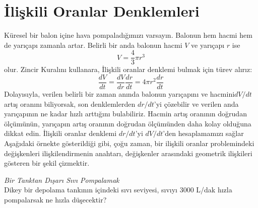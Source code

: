 \section{\protect İlişkili Oranlar Denklemleri}
Küresel bir balon içine hava pompaladığımızı varsayın. Balonun hem hacmi hem de yarıçapı zamanla artar. Belirli bir anda balonun hacmi $V$ ve yarıçapı $r$ ise
	\begin{equation*}
	V=\frac{4}{3}\pi r^3
	\end{equation*}
olur. Zincir Kuralını kullanara, İlişkili oranlar denklemi bulmak için türev alırız:
	\begin{equation*}
	\frac{dV}{dt}=\frac{dV}{dr}\frac{dr}{dt}=4\pi r^2 \frac{dr}{dt}
	\end{equation*}
Dolayısıyla, verilen belirli bir zaman anında balonun yarıçapını ve hacmini$dV/dt$ artış oranını biliyorsak, son denklemlerden $dr/dt$'yi çözebilir ve verilen anda yarıçapının ne kadar hızlı arttığını bulabiliriz. Hacmin artış oranının doğrudan ölçümünün, yarıçapın artış oranının doğrudan ölçümünden daha kolay olduğuna dikkat edin. İlişkili oranlar denklemi $dr/dt$'yi $dV/dt$'den hesaplamamızı sağlar\\
Aşağıdaki örnekte gösterildiği gibi, çoğu zaman, bir ilişkili oranlar problemindeki değişkenleri ilişkilendirmenin anahtarı, değişkenler arasındaki geometrik ilişkileri gösteren bir şekil çizmektir.
\begin{ornek}\textit{Bir Tanktan Dışarı Sıvı Pompalamak}\\
	Dikey bir depolama tankının içindeki sıvı seviyesi, sıvıyı 3000 L/dak hızla pompalarsak ne hızla düşecektir?
\end{ornek}

